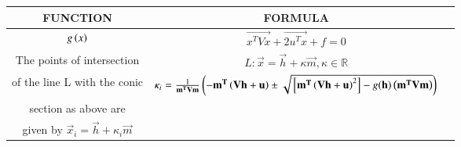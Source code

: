\begin{center}
    \begin{tabular}{|c|c|c|} 
        \hline
            \textbf{FUNCTION} & \textbf{FORMULA} \\
        \hline
            $g\left(x\right)$ & $\vec{x^TVx}+\vec{2u^Tx}+f=0$ \\
        \hline
	    The points of intersection & $ L: \vec{x} = \vec{h} + \kappa\vec{m}, \kappa \in \mathbb{R} $ \\ of the line L with the conic & $\kappa_i = \frac{1}{\mathbf{m^TVm}}\left(\mathbf{-m^T\left(Vh+u\right)} \pm \sqrt{{}\left[\mathbf{m^T\left(Vh+u\right)}^2\right] - g(\mathbf{h})\left(\mathbf{m^TVm}\right)}\right) $ \\ section as above are \\ given by $ \vec{x}_i = \vec{h} + \kappa_i\vec{m} $ \\
        \hline
    \end{tabular}
\end{center}
